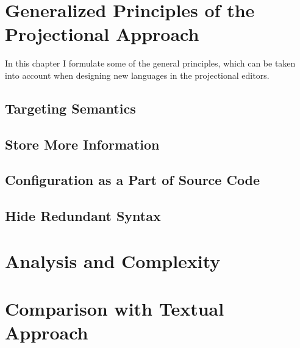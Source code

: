 \chapter{Generalized Principles of the Projectional Approach}
\label{chapter:genprinciples}

In this chapter I formulate some of the general principles, which can be taken into
account when designing new languages in the projectional editors.

\section{Targeting Semantics}

\section{Store More Information}


\section{Configuration as a Part of Source Code}

\section{Hide Redundant Syntax}



\chapter{Analysis and Complexity}



\chapter{Comparison with Textual Approach}
\label{chapter:comparison}

